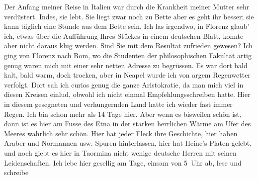 \begin{ledgroupsized}[t]{13cm}
           \pstart
           Der Anfang meiner Reise in Italien war durch
               die Krankheit meiner Mutter
               sehr {\pb}verdüstert. Indes, sie lebt.
               Sie liegt zwar noch zu Bette aber es geht ihr besser; sie kann täglich eine Stunde
               aus dem Bette sein.\pend
           \pstart
           Ich las irgendwo, in Florenz glaub’ ich, etwas
               über die Aufführung Ihres Stückes in einem deutschen Blatt, konnte aber nicht daraus klug werden. Sind
               Sie mit dem Resultat zufrieden gewesen?\pend
           \pstart
           Ich ging von Florenz nach Rom, wo die Studenten der philosophischen Fakultät artig genug waren mich mit einer sehr netten
               Adresse zu begrüssen. Es war dort bald kalt, bald warm, doch trocken, aber in Neapel wurde ich von argem Regenwetter verfolgt.
               Dort sah ich curios genug die ganze Aristokratie, da man mich {\pb}viel in diesen Kreisen einlud,
               obwohl ich nicht einmal Empfehlungsschreiben hatte.\pend
           \pstart
           Hier in diesem gesegneten und verhungernden Land hatte ich wieder fast immer Regen.
               Ich bin schon mehr als 14 Tage hier. Aber wenn es bisweilen schön ist, dann ist es
               hier am Fusse des Etna in der starken herrlichen
               Wärme am Ufer des Meeres wahrlich sehr schön. Hier hat jeder Fleck ihre Geschichte,
               hier haben Araber und Normannen usw. Spuren hinterlassen, hier hat Heine’s Platen gelebt, und noch giebt es hier in Taormina nicht wenige deutsche Herren mit seinen Leidenschaften.\pend
           \pstart
           Ich lebe hier gesellig am Tage, einsam {\pb}von 5 Uhr ab, lese und schreibe

\end{ledgroupsized}
